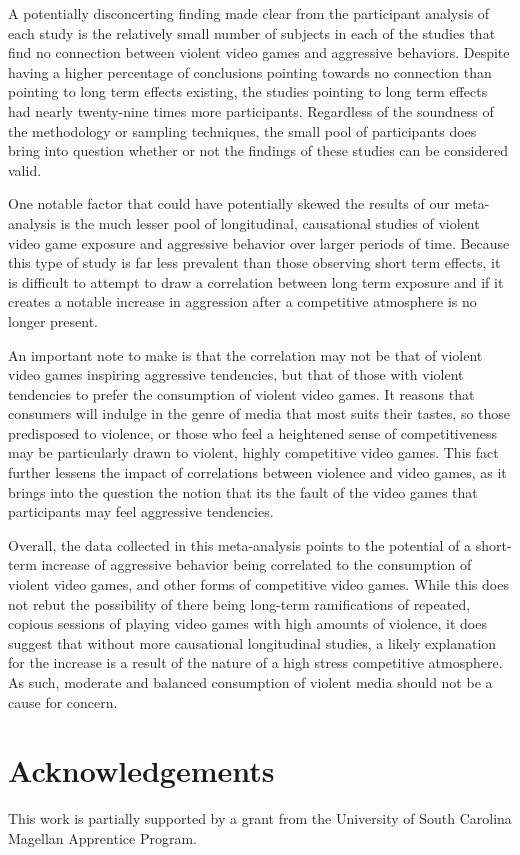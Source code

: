 \documentclass[11pt]{article}
\begin{document}
A potentially disconcerting finding made clear from the participant analysis of each study is the relatively small number of subjects in each of the studies that find no connection between violent video games and aggressive behaviors. Despite having a higher percentage of conclusions pointing towards no connection than pointing to long term effects existing, the studies pointing to long term effects had nearly twenty-nine times more participants. Regardless of the soundness of the methodology or sampling techniques, the small pool of participants does bring into question whether or not the findings of these studies can be considered valid. 

One notable factor that could have potentially skewed the results of our meta-analysis is the much lesser pool of longitudinal, causational studies of violent video game exposure and aggressive behavior over larger periods of time. Because this type of study is far less prevalent than those observing short term effects, it is difficult to attempt to draw a correlation between long term exposure and if it creates a notable increase in aggression after a competitive atmosphere is no longer present. 

An important note to make is that the correlation may not be that of violent video games inspiring aggressive tendencies, but that of those with violent tendencies to prefer the consumption of violent video games. It reasons that consumers will indulge in the genre of media that most suits their tastes, so those predisposed to violence, or those who feel a heightened sense of competitiveness may be particularly drawn to violent, highly competitive video games. This fact further lessens the impact of correlations between violence and video games, as it brings into the question the notion that its the fault of the video games that participants may feel aggressive tendencies.

Overall, the data collected in this meta-analysis points to the potential of a short-term increase of aggressive behavior being correlated to the consumption of violent video games, and other forms of competitive video games. While this does not rebut the possibility of there being long-term ramifications of repeated, copious sessions of playing video games with high amounts of violence, it does suggest that without more causational longitudinal studies, a likely explanation for the increase is a result of the nature of a high stress competitive atmosphere. As such, moderate and balanced consumption of violent media should not be a cause for concern.

\section{Acknowledgements}

This work is partially supported by a grant from the University of South Carolina Magellan Apprentice Program.

\printbibliography
\end{document}
